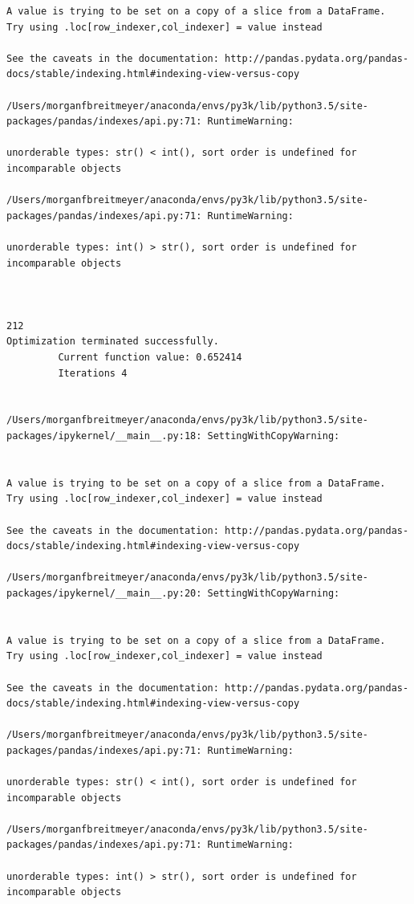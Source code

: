 \begin{lstlisting}
A value is trying to be set on a copy of a slice from a DataFrame.
Try using .loc[row_indexer,col_indexer] = value instead

See the caveats in the documentation: http://pandas.pydata.org/pandas-docs/stable/indexing.html#indexing-view-versus-copy

/Users/morganfbreitmeyer/anaconda/envs/py3k/lib/python3.5/site-packages/pandas/indexes/api.py:71: RuntimeWarning:

unorderable types: str() < int(), sort order is undefined for incomparable objects

/Users/morganfbreitmeyer/anaconda/envs/py3k/lib/python3.5/site-packages/pandas/indexes/api.py:71: RuntimeWarning:

unorderable types: int() > str(), sort order is undefined for incomparable objects



212
Optimization terminated successfully.
         Current function value: 0.652414
         Iterations 4


/Users/morganfbreitmeyer/anaconda/envs/py3k/lib/python3.5/site-packages/ipykernel/__main__.py:18: SettingWithCopyWarning:


A value is trying to be set on a copy of a slice from a DataFrame.
Try using .loc[row_indexer,col_indexer] = value instead

See the caveats in the documentation: http://pandas.pydata.org/pandas-docs/stable/indexing.html#indexing-view-versus-copy

/Users/morganfbreitmeyer/anaconda/envs/py3k/lib/python3.5/site-packages/ipykernel/__main__.py:20: SettingWithCopyWarning:


A value is trying to be set on a copy of a slice from a DataFrame.
Try using .loc[row_indexer,col_indexer] = value instead

See the caveats in the documentation: http://pandas.pydata.org/pandas-docs/stable/indexing.html#indexing-view-versus-copy

/Users/morganfbreitmeyer/anaconda/envs/py3k/lib/python3.5/site-packages/pandas/indexes/api.py:71: RuntimeWarning:

unorderable types: str() < int(), sort order is undefined for incomparable objects

/Users/morganfbreitmeyer/anaconda/envs/py3k/lib/python3.5/site-packages/pandas/indexes/api.py:71: RuntimeWarning:

unorderable types: int() > str(), sort order is undefined for incomparable objects




\end{lstlisting}
